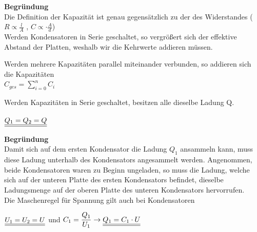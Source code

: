 \textbf{Begründung} \\
Die Definition der Kapazität ist genau gegensätzlich zu der des Widerstandes ($ R \propto \frac{l}{A}$ , $ C \propto \cdot \frac{A}{d} $)\\
Werden Kondensatoren in Serie geschaltet, so vergrößert sich der effektive Abstand der Platten, weshalb wir die Kehrwerte addieren müssen. \\




\beginip
Werden mehrere Kapazitäten parallel miteinander verbunden, so addieren sich die Kapazitäten \\
\formulaBegin
$\displaystyle C_{ges} = \sum_{i=0}^n C_i $
\formulaEnd
\iend

\newpage
{}
\beginip
Werden Kapazitäten in Serie geschaltet, besitzen alle dieselbe Ladung Q.
\begin{center}
	\fix
	 $\displaystyle \underline{\underline{Q_1 = Q_2 = Q}}$
\end{center}
\iend

\textbf{Begründung} \\
Damit sich auf dem ersten Kondensator die Ladung $Q_1$ ansammeln kann, muss diese Ladung unterhalb des Kondensators angesammelt werden. Angenommen, beide Kondensatoren waren zu Beginn ungeladen,
so muss die Ladung, welche sich auf der unteren Platte des ersten Kondensators befindet, dieselbe Ladungsmenge auf der oberen Platte des unteren Kondensators hervorrufen. \\

\beginip
Die Maschenregel für Spannung gilt auch bei Kondensatoren
\begin{center}
	\fix
	$\displaystyle \underline{\underline{U_1 = U_2 = U}} $  und  $\displaystyle C_1 = \frac{Q_1}{U_1} \rightarrow \underline{\underline{Q_1 = C_1 \cdot U}}$
\end{center}
\iend
